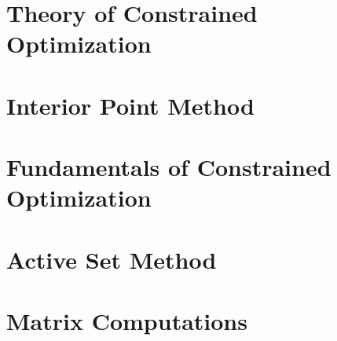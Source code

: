 \documentclass[11pt]{article}
\begin{document}
    \section{Theory of Constrained Optimization} \label{sec: chap12}
    
    \section{Interior Point Method} \label{sec: chap14}
    
    \section{Fundamentals of Constrained Optimization} \label{sec: chap15}
    

    \section{Active Set Method} \label{sec: chap16}
    

    \section{Matrix Computations} \label{sec: matrix computations}
    
\end{document}
